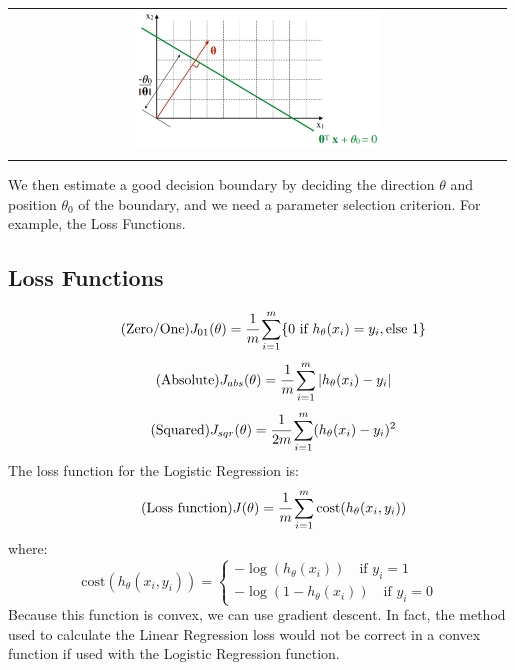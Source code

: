 \begin{center}
    \begin{tabular}{c}
        \\ \includegraphics[width=0.5\textwidth]{images/Classification2.png} \\ \\
    \end{tabular}
\end{center}
We then estimate a good decision boundary by deciding the direction $\theta$ and position $\theta_0$ of the boundary, and we need a parameter selection criterion. For example, the Loss Functions.

\subsection{Loss Functions}
\begin{equation} \tag{Zero/One}
    J_{01}(\theta) = \cfrac{1}{m} \sum_{i=1}^m \{ 0 \text{ if } h_\theta(x_i) = y_i, \text{else } 1 \}
\end{equation}
\begin{equation} \tag{Absolute}
    J_{abs}(\theta) = \cfrac{1}{m} \sum_{i=1}^m | h_\theta(x_i) - y_i |
\end{equation}
\begin{equation} \tag{Squared}
    J_{sqr}(\theta) = \cfrac{1}{2m} \sum_{i=1}^m (h_\theta(x_i) - y_i )^2
\end{equation}
The loss function for the Logistic Regression is:
\begin{equation} \tag{Loss function}
    J(\theta) = \cfrac{1}{m} \sum_{i=1}^m \text{cost}(h_\theta(x_i, y_i))
\end{equation}
where:
\begin{equation} \tag*{}
    \text{cost}(h_\theta(x_i, y_i)) =
    \begin{cases}
        -\log(h_\theta(x_i)) \quad \text{if } y_i = 1 \\
        -\log(1 - h_\theta(x_i)) \quad \text{if } y_i = 0
    \end{cases}
\end{equation}
Because this function is convex, we can use gradient descent. In fact, the method used to calculate the Linear Regression loss would not be correct in a convex function if used with the Logistic Regression function.
\newpage